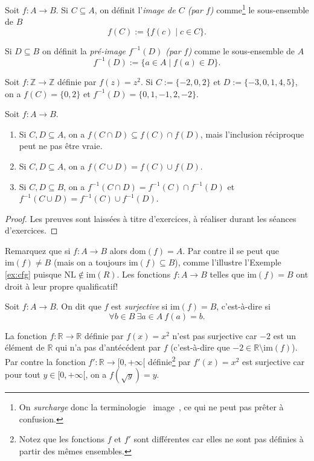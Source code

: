 \documentclass[french,course,oneside,theoremnosection]{lecture}
\newcommand{\R}{\mathbb{R}}
\newcommand{\Z}{\mathbb{Z}}
\newcommand{\dom}{\mathrm{dom}}
\newcommand{\im}{\mathrm{im}}
\begin{document}
\begin{definition}
Soit $f\colon A \to B$. Si $C\subseteq A$, on définit l'\emph{image de $C$ (par $f$)} comme\footnote{On \emph{surcharge} donc la terminologie \og~image~\fg, ce qui ne peut pas prêter à confusion.} le sous-ensemble de $B$ 
\[
f(C):=\{f(c) \mid c \in C\}.
\]

Si $D \subseteq B$ on définit la \emph{pré-image $f^{-1}(D)$ (par $f$)} comme le sous-ensemble de $A$
\[
f^{-1}(D):=\{a \in A \mid f(a) \in D\}.
\]
\end{definition}

\begin{example}
Soit $f\colon \Z \to \Z$ définie par $f(z)=z^2$. Si $C:=\{-2,0,2\}$ et $D:=\{-3,0,1,4, 5\}$, on a $f(C)=\{0,2\}$ et $f^{-1}(D)=\{0, 1, -1, 2, -2\}$.
\end{example}

\begin{proposition}
Soit $f\colon A \to B$.
\begin{enumerate}
\item Si $C, D \subseteq A$, on a $f(C \cap D) \subseteq f(C) \cap f(D)$, mais l'inclusion réciproque peut ne pas être vraie.
 \item Si $C, D \subseteq A$, on a $f(C \cup D) = f(C) \cup f(D)$.
 \item Si $C, D \subseteq B$, on a $f^{-1}(C \cap D) = f^{-1}(C) \cap f^{-1}(D)$ et $f^{-1}(C \cup D) = f^{-1}(C) \cup f^{-1}(D)$. 
\end{enumerate}
\end{proposition}
\begin{proof}
Les preuves sont laissées à titre d'exercices, à réaliser durant les séances d'exercices.
\end{proof}

Remarquez que si $f\colon A \to B$ alors $\dom(f)=A$. Par contre il se peut que $\im(f)\neq B$ (mais on a toujours $\im(f)\subseteq B$), comme l'illustre l'Exemple \ref{ex:cfg} puisque $\text{NL}\not\in\im(R)$. Les fonctions $f\colon A  \to B$ telles que $\im(f)=B$ ont droit à leur propre qualificatif!
\begin{definition}
Soit $f\colon A \to B$. On dit que $f$ est \emph{surjective} si $\im(f)=B$, c'est-à-dire si
\[
\forall b \in B\ \exists a\in A \ f(a)=b.
\]
\end{definition}
\begin{example}
La fonction $f\colon \R \to \R$ définie par $f(x)=x^2$ n'est pas surjective car $-2$ est un élément de $\R$ qui n'a pas d’antécédent par $f$ (c'est-à-dire que $-2\in \R\setminus \im(f)$). Par contre la fonction $f'\colon \R \to [0, +\infty[$ définie\footnote{Notez que les fonctions $f$ et $f'$ sont différentes car elles ne sont pas définies à partir des mêmes ensembles.} par $f'(x)=x^2$ est surjective car pour tout $y\in [0, +\infty[$, on a $f(\sqrt{y})=y$.
\end{example}
\end{document}
